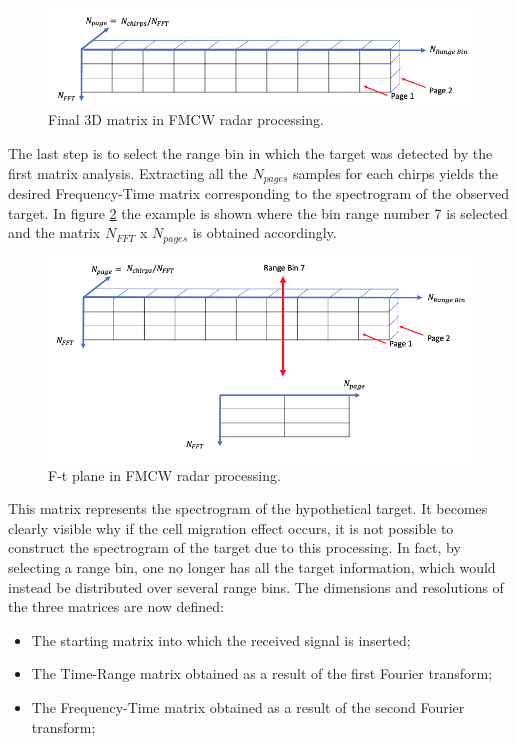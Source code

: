 \begin{figure}[h!]
\centering
\includegraphics[width=15cm]{FMCW mD analysis-chap4/img/Chirp-rangebin-pages matrix.png}
\caption{Final 3D matrix in FMCW radar processing.}
\label{3dmatrix}
\end{figure}

The last step is to select the range bin in which the target was detected by the first matrix analysis. Extracting all the $N_{pages}$ samples for each chirps yields the desired Frequency-Time matrix corresponding to the spectrogram of the observed target. In figure \ref{finalfreqetimemap} the example is shown where the bin range number 7 is selected and the matrix $N_{FFT}$ x $N_{pages}$ is obtained accordingly. 

\begin{figure}[h!]
\centering
\includegraphics[width=15cm]{FMCW mD analysis-chap4/img/Final frequency time map.png}
\caption{F-t plane in FMCW radar processing.}
\label{finalfreqetimemap}
\end{figure}

This matrix represents the spectrogram of the hypothetical target. It becomes clearly visible why if the cell migration effect occurs, it is not possible to construct the spectrogram of the target due to this processing. In fact, by selecting a range bin, one no longer has all the target information, which would instead be distributed over several range bins. The dimensions and resolutions of the three matrices are now defined:

\begin{itemize}
    \item The starting matrix into which the received signal is inserted;
    
    \item The Time-Range matrix obtained as a result of the first Fourier transform;
         
    \item The Frequency-Time matrix obtained as a result of the second Fourier transform;

\end{itemize}


